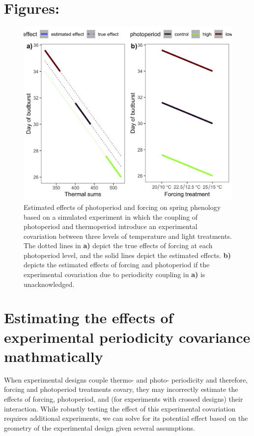 \documentclass[11pt]{article}
\begin{document}
\section*{Figures:}
 \begin{figure}[h!]
    \centering
 \includegraphics[width=.6\textwidth]{..//Plots/periodicity_figures/apparent4spp.jpeg}
    \caption{Estimated effects of photoperiod and forcing on spring phenology based on a simulated experiment in which the coupling of photoperiod and thermoperiod introduce an experimental covariation between three levels of temperature and light treatments. The dotted lines in \textbf{a)} depict the true effects of forcing at each photoperiod level, and the solid lines depict the estimated effects. \textbf{b)} depicts the estimated effects of forcing and photoperiod if the experimental covariation due to periodicity coupling in \textbf{a)} is unacknowledged.}
    \label{fig:suplines}
\end{figure}

\section*{Estimating the effects of experimental periodicity covariance mathmatically}
When experimental designs couple thermo- and photo- periodicity and therefore, forcing and photoperiod treatments covary, they may incorrectly estimate the effects of forcing, photoperiod, and (for experiments with crossed designs) their interaction. While robustly testing the effect of this experimental covariation requires additional experiments, we can solve for its potential effect based on the geometry of the experimental design given several assumptions.
\end{document}
